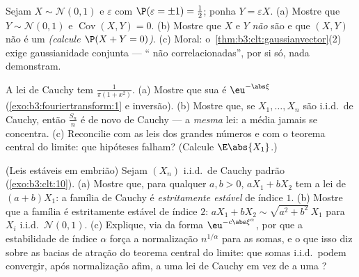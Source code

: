 \begin{exercise}[$\star\star\star$]\label{exo:b3:clt:9}
Sejam $X \sim \mathcal N(0,1)$ e $\varepsilon$  com $\P(\varepsilon = \pm1) = \frac12$; ponha $Y =
\varepsilon X$.
(a) Mostre que $Y \sim \mathcal N(0,1)$ e $\operatorname{Cov}(X, Y) = 0$.
(b) Mostre que $X$ e $Y$ \emph{não} são  e que
$(X, Y)$ não é um  \emph{(calcule $\P(X + Y =
0)$)}.
(c) Moral: o~\cref{thm:b3:clt:gaussianvector}(2) exige gaussianidade conjunta ---
`` não correlacionadas'', por si só, nada demonstram.
\end{exercise}

\begin{exercise}[$\star\star$]\label{exo:b3:clt:10}
A lei de Cauchy tem  $\frac1{\pi(1 + x^2)}$.
(a) Mostre que sua  é $\eu^{-\abs\xi}$ (\cref{exo:b3:fouriertransform:1} e
inversão).
(b) Mostre que, se $X_1, \dots, X_n$ são i.i.d.\ de Cauchy, então $\frac{S_n}n$ é de novo de
Cauchy --- a \emph{mesma} lei: a média jamais se concentra.
(c) Reconcilie com as leis dos grandes números e com o teorema central
do limite: que hipóteses falham? (Calcule $\E\abs{X_1}$.)
\end{exercise}

\begin{exercise}[$\star\star$]\label{exo:b3:clt:11}
(Leis estáveis em embrião) Sejam $(X_n)$ i.i.d.\ de Cauchy padrão
(\cref{exo:b3:clt:10}).
(a) Mostre que, para qualquer $a, b > 0$, $aX_1 + bX_2$ tem a lei de $(a + b)X_1$: a família
de Cauchy é \emph{estritamente estável} de índice $1$.
(b) Mostre que a família  é estritamente estável de índice
$2$: $aX_1 + bX_2 \sim \sqrt{a^2 + b^2}\,X_1$ para $X_i$ i.i.d.\ $\mathcal N(0,1)$.
(c) Explique, via  da forma $\eu^{-c\abs\xi^\alpha}$, por que a
estabilidade de índice $\alpha$ força a normalização $n^{1/\alpha}$ para as
somas, e o que isso diz sobre as bacias de atração do teorema central do
limite: que somas i.i.d.\ podem convergir, após normalização afim, a uma
lei de Cauchy em vez de a uma ?
\end{exercise}

